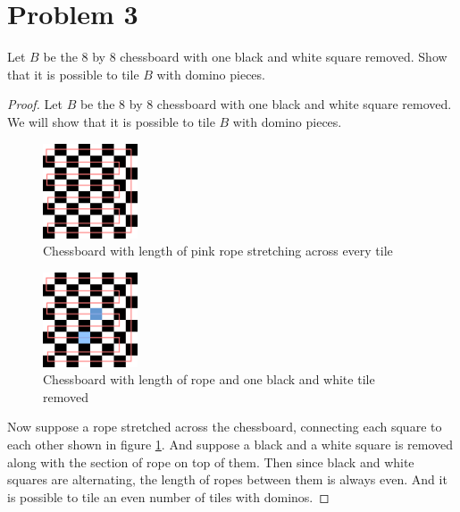 \documentclass{article}
\begin{document}

    \section*{Problem 3}

    Let $B$ be the 8 by 8 chessboard with one black and white square removed. Show that it is possible to tile $B$ with domino pieces.

    \begin{proof}
        Let $B$ be the 8 by 8 chessboard with one black and white square removed. We will show that it is possible to tile $B$ with domino pieces.

        \begin{figure}[ht]
            \centering
            \includegraphics[width=0.25\textwidth]{Q3_01.png}
            \caption{Chessboard with length of pink rope stretching across every tile}
            \label{fig:rope1}
        \end{figure}
        \begin{figure}[ht]
            \centering
            \includegraphics[width=0.25\textwidth]{Q3_02.png}  
            \caption{Chessboard with length of rope and one black and white tile removed}
            \label{fig:rope2}
        \end{figure}

        Now suppose a rope stretched across the chessboard, connecting each square to each other shown in figure \ref{fig:rope1}. And suppose a black and a white square is removed along with the section of rope on top of them. Then since black and white squares are alternating, the length of ropes between them is always even. And it is possible to tile an even number of tiles with dominos.
    \end{proof}
\end{document}
